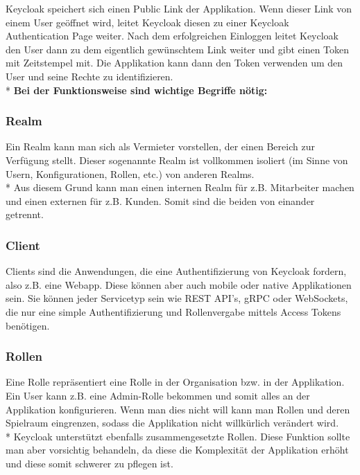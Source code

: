 Keycloak speichert sich einen Public Link der Applikation. Wenn dieser Link von einem User geöffnet wird, leitet Keycloak diesen zu einer Keycloak Authentication Page weiter.
Nach dem erfolgreichen Einloggen leitet Keycloak den User dann zu dem eigentlich gewünschtem Link weiter und gibt einen Token mit Zeitstempel mit.
Die Applikation kann dann den Token verwenden um den User und seine Rechte zu identifizieren. \cite{KeycloakMakeIT} \\*
\textbf{Bei der Funktionsweise sind wichtige Begriffe nötig:}

\subsubsection{Realm}
Ein Realm kann man sich als Vermieter vorstellen, der einen Bereich zur Verfügung stellt. Dieser sogenannte Realm ist vollkommen isoliert (im Sinne von Usern, Konfigurationen, Rollen, etc.)
von anderen Realms. \\* Aus diesem Grund kann man einen internen Realm für z.B. Mitarbeiter machen und einen externen für z.B. Kunden. Somit sind die beiden von einander getrennt. \cite{KeyCloakCodex}

\subsubsection{Client}
Clients sind die Anwendungen, die eine Authentifizierung von Keycloak fordern, also z.B. eine Webapp. Diese können aber auch mobile oder native Applikationen sein.
Sie können jeder Servicetyp sein wie REST API's, gRPC oder WebSockets, die nur eine simple Authentifizierung und Rollenvergabe mittels Access Tokens benötigen. \cite{KeyCloakCodex}

\subsubsection{Rollen}
Eine Rolle repräsentiert eine Rolle in der Organisation bzw. in der Applikation. Ein User kann z.B. eine Admin-Rolle bekommen und somit alles an der Applikation konfigurieren.
Wenn man dies nicht will kann man Rollen und deren Spielraum eingrenzen, sodass die Applikation nicht willkürlich verändert wird. \\*
Keycloak unterstützt ebenfalls zusammengesetzte Rollen. Diese Funktion sollte man aber vorsichtig behandeln, da diese die Komplexität der Applikation erhöht und diese somit schwerer zu pflegen ist. \cite{KeyCloakCodex}

